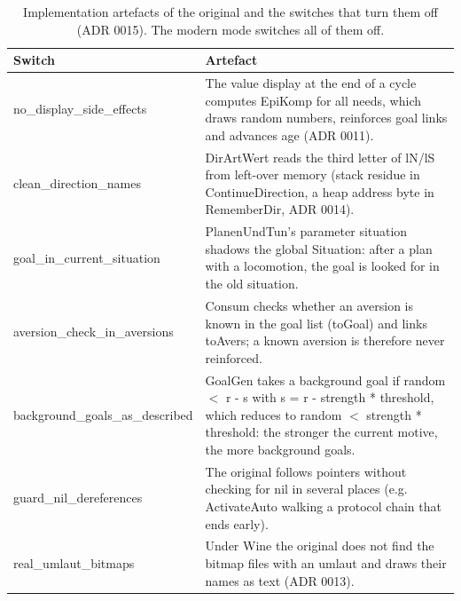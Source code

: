 \begin{table}[t]
\centering
\caption{Implementation artefacts of the original and the switches that turn them off (ADR 0015). The modern mode switches all of them off.}
\label{tab:T2}
\begin{tabular}{ll}
\toprule
Switch & Artefact \\
\midrule
no\_display\_side\_effects & The value display at the end of a cycle computes EpiKomp for all needs, which draws random numbers, reinforces goal links and advances age (ADR 0011). \\
clean\_direction\_names & DirArtWert reads the third letter of lN/lS from left-over memory (stack residue in ContinueDirection, a heap address byte in RememberDir, ADR 0014). \\
goal\_in\_current\_situation & PlanenUndTun's parameter situation shadows the global Situation: after a plan with a locomotion, the goal is looked for in the old situation. \\
aversion\_check\_in\_aversions & Consum checks whether an aversion is known in the goal list (toGoal) and links toAvers; a known aversion is therefore never reinforced. \\
background\_goals\_as\_described & GoalGen takes a background goal if random $<$ r - s with s = r - strength * threshold, which reduces to random $<$ strength * threshold: the stronger the current motive, the more background goals. \\
guard\_nil\_dereferences & The original follows pointers without checking for nil in several places (e.g. ActivateAuto walking a protocol chain that ends early). \\
real\_umlaut\_bitmaps & Under Wine the original does not find the bitmap files with an umlaut and draws their names as text (ADR 0013). \\
\bottomrule
\end{tabular}
\end{table}
